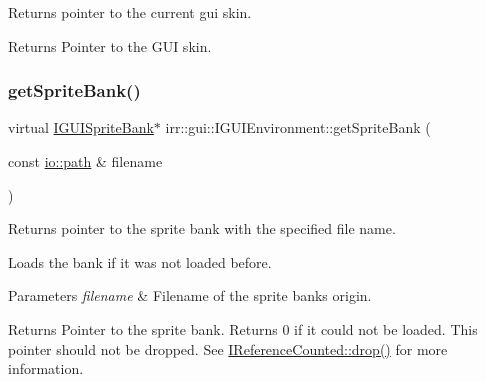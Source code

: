 Returns pointer to the current gui skin. 

\begin{DoxyReturn}{Returns}
Pointer to the G\+UI skin. 
\end{DoxyReturn}
\mbox{\label{classirr_1_1gui_1_1IGUIEnvironment_a187ebb28837dbdb88810f7e493096c3f}} 
\subsubsection{\texorpdfstring{get\+Sprite\+Bank()}{getSpriteBank()}}
{\footnotesize\ttfamily virtual \hyperlink{classirr_1_1gui_1_1IGUISpriteBank}{I\+G\+U\+I\+Sprite\+Bank}$\ast$ irr\+::gui\+::\+I\+G\+U\+I\+Environment\+::get\+Sprite\+Bank (\begin{DoxyParamCaption}\item[{const \hyperlink{namespaceirr_1_1io_ab1bdc45edb3f94d8319c02bc0f840ee1}{io\+::path} \&}]{filename }\end{DoxyParamCaption})\hspace{0.3cm}{\ttfamily [pure virtual]}}



Returns pointer to the sprite bank with the specified file name. 

Loads the bank if it was not loaded before. 
\begin{DoxyParams}{Parameters}
{\em filename} & Filename of the sprite bank\textquotesingle{}s origin. \\
\hline
\end{DoxyParams}
\begin{DoxyReturn}{Returns}
Pointer to the sprite bank. Returns 0 if it could not be loaded. This pointer should not be dropped. See \hyperlink{classirr_1_1IReferenceCounted_a03856a09355b89d178090c4a5f738543}{I\+Reference\+Counted\+::drop()} for more information. 
\end{DoxyReturn}
\mbox{\label{classirr_1_1gui_1_1IGUIEnvironment_a48f5e442f0a2074a531234ab83148fe2}} 

